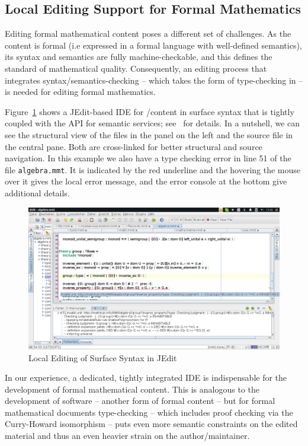 \subsection{Local Editing Support for Formal Mathematics}\label{sec:local-formal}

Editing formal mathematical content poses a different set of challenges. As the content is
formal (i.e expressed in a formal language with well-defined semantics), its syntax and
semantics are fully machine-checkable, and this defines the standard of mathematical
quality. Consequently, an editing process that integrates syntax/semantics-checking --
which takes the form of type-checking in \mmt -- is needed for editing formal mathematics.

Figure~\ref{fig:jedit2} shows a JEdit-based IDE for \omdoc/\mmt content in \mmt surface
syntax that is tightly coupled with the \mmt API for semantic services;
see~\cite{Rabe:LII14} for details. In a nutshell, we can see the structural view of the
files in the panel on the left and the source file in the central pane. Both are
cross-linked for better structural and source navigation. In this example we also have a
type checking error in line 51 of the file \texttt{algebra.mmt}. It is indicated by the
red underline and the hovering the mouse over it gives the local error message, and the
error console at the bottom give additional details.

\begin{figure}[ht]\centering
  \includegraphics[width=15cm]{jedit2}
  \caption{Local Editing of \mmt Surface Syntax in JEdit}\label{fig:jedit2}
\end{figure}

In our experience, a dedicated, tightly integrated IDE is indispensable for the
development of formal mathematical content. This is analogous to the development of
software -- another form of formal content -- but for formal mathematical documents
type-checking -- which includes proof checking via the Curry-Howard isomorphism -- puts
even more semantic constraints on the edited material and thus an even heavier strain on
the author/maintainer.

